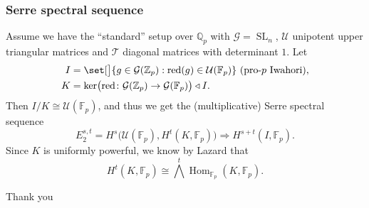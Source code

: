 \documentclass{beamer}
\newcommand*\Z{\mathbb{Z}}
\newcommand*\Q{\mathbb{Q}}
\newcommand*\F{\mathbb{F}}
\DeclareMathOperator{\SL}{SL} %
\DeclareMathOperator{\Hom}{Hom} %
\DeclareMathOperator{\reduc}{red}
\newcommand*\iso{\cong} %
\newcommand*\gs[1]{\mathcal{#1}}
\begin{document}
\begin{frame}
  \frametitle{Serre spectral sequence}

  Assume we have the ``standard'' setup over $\Q_{p}$ with $\gs{G} = \SL_{n}$, $\gs{U}$ unipotent upper triangular matrices and $\gs{T}$ diagonal matrices with determinant $1$. Let
  \begin{align*}
    I &= \set[\big]{ g \in \gs{G}(\Z_{p}) : \reduc(g) \in \gs{U}(\F_{p}) } \text{ (pro-}p\text{ Iwahori)}, \\
    K &= \ker\bigl( \reduc \colon \gs{G}(\Z_{p}) \to \gs{G}(\F_{p}) \bigr) \triangleleft I.
  \end{align*}
  Then $I/K \iso \gs{U}(\F_{p})$, and thus we get the (multiplicative) Serre spectral sequence
  \[
    E_{2}^{s,t} = H^{s}\bigl( \gs{U}(\F_{p}), H^{t}(K,\F_{p}) \bigr) \Longrightarrow H^{s+t}(I,\F_{p}).
  \]
  Since $K$ is uniformly powerful, we know by Lazard that
  \[
    H^{t}(K,\F_{p}) \iso \bigwedge^{t} \Hom_{\F_{p}}(K,\F_{p}).
  \]
\end{frame}

\begin{frame}
\Huge{\centerline{Thank you}}
\end{frame}
\end{document}
